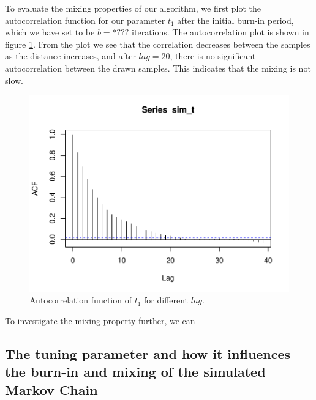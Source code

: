 


To evaluate the mixing properties of our algorithm, we first plot the autocorrelation function for our parameter $t_1$ after the initial burn-in period, which we have set to be $b = *???$ iterations. The autocorrelation plot is shown in figure \ref{fig:acf_t}. From the plot we see that the correlation decreases between the samples as the distance increases, and after $lag = 20$, there is no significant autocorrelation between the drawn samples. This indicates that the mixing is not slow. 

\begin{figure}[h]
    \centering
    \includegraphics{Images/acf_t_10000.pdf}
    \caption{Autocorrelation function of $t_1$ for different $lag$. }
    \label{fig:acf_t}
\end{figure}

To investigate the mixing property further, we can 

\subsection{The tuning parameter and how it influences the burn-in and mixing of the simulated Markov Chain}


